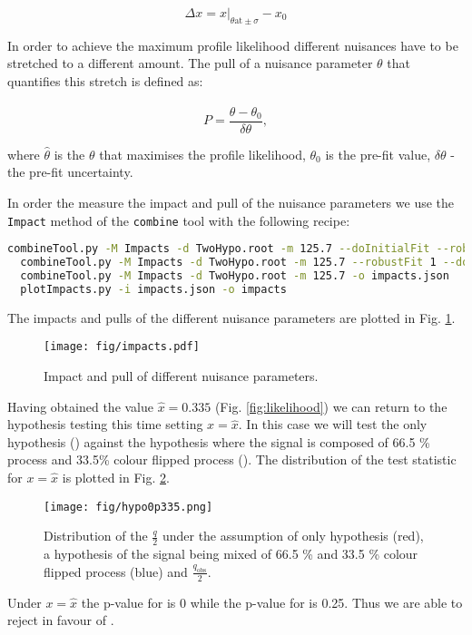 \begin{equation}
  \Delta x = x\bigg\rvert_{\theta \text{at} \pm\sigma}-x_{0}
\end{equation} 

In order to achieve the maximum profile likelihood different nuisances have to be stretched to a different amount. The pull of a nuisance parameter $\theta$ that quantifies this stretch is defined as:

\begin{equation}
  P = \frac{\hat{\theta}-\theta_{0}}{\delta\theta},
\end{equation} 

where $\hat{\theta}$ is the $\theta$ that maximises the profile likelihood, $\theta_{0}$ is the pre-fit value, $\delta\theta$ - the pre-fit uncertainty.

In order the measure the impact and pull of the nuisance parameters we use the \lstinline[language=sh]|Impact| method of the \lstinline[language=sh]|combine| tool with the following recipe:

\begin{lstlisting}[language=sh]
  combineTool.py -M Impacts -d TwoHypo.root -m 125.7 --doInitialFit --robustFit 1
  combineTool.py -M Impacts -d TwoHypo.root -m 125.7 --robustFit 1 --doFits
  combineTool.py -M Impacts -d TwoHypo.root -m 125.7 -o impacts.json
  plotImpacts.py -i impacts.json -o impacts
\end{lstlisting}

The impacts and pulls of the different nuisance parameters are plotted in Fig. \ref{fig:impacts}.

\begin{figure}
  \centering
  \texttt{[image: fig/impacts.pdf]}
  \caption{Impact and pull of different nuisance parameters.}
  \label{fig:impacts}
\end{figure}

Having obtained the value $\hat{x}=0.335$ (Fig. \ref{fig:likelihood}) we can return to the hypothesis testing this time setting $x=\hat{x}$. In this case we will test the \ttbar only hypothesis (\Hnull) against the hypothesis where the signal is composed of 66.5 \% \ttbar process and 33.5\% colour flipped \ttbar process (\Halt). The distribution of the test statistic for $x=\hat{x}$ is plotted in Fig. \ref{fig:hypo0p335}.

\begin{figure}
  \centering
  \texttt{[image: fig/hypo0p335.png]}
  \caption{Distribution of the $\frac{q}{2}$ under the assumption of \ttbar only hypothesis (red), a hypothesis of the signal being mixed of 66.5 \% \ttbar and 33.5 \% colour flipped \ttbar process (blue) and $\frac{q_{\text{obs}}}{2}$.}
  \label{fig:hypo0p335}
\end{figure}

Under $x=\hat{x}$ the p-value for \Hnull is 0 while the p-value for \Halt is 0.25. Thus we are able to reject \Hnull in favour of \Halt.

